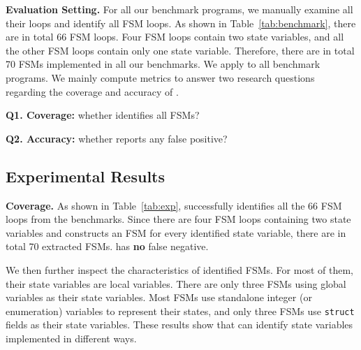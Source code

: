 \noindent\textbf{Evaluation Setting.}
For all our benchmark programs, we manually examine all their loops and
identify all FSM loops.
As shown in Table~\ref{tab:benchmark}, there are in
total 66 FSM loops.
Four FSM loops contain two state variables,
and all the other FSM loops contain only one state variable.
Therefore, there are in total 70 FSMs implemented in all our benchmarks.
We apply \Tool{} to all benchmark programs.
We mainly compute metrics to answer two research
questions regarding the coverage and accuracy of \Tool{}.

\noindent\textbf{Q1. Coverage:} whether \Tool{} identifies all FSMs?

\noindent\textbf{Q2. Accuracy:} whether \Tool{} reports any false positive?

\subsection{Experimental Results}
\label{sec:results}



\noindent\textbf{Coverage.}
As shown in Table~\ref{tab:exp}, \Tool{} successfully identifies
all the 66 FSM loops
from the benchmarks. Since there are four FSM loops containing
two state variables and \Tool{} constructs an FSM for every identified state variable,
there are in total 70 extracted FSMs.
\Tool{} has \textbf{no} false negative.



We then further inspect the characteristics of identified FSMs.
For most of them, their state variables are local variables.
There are only three FSMs using global variables as their state variables.
Most FSMs use standalone integer (or enumeration) variables to represent their states,
and only three FSMs use \texttt{struct} fields as their state variables.
These results show that \Tool{} can identify 
state variables implemented in different ways.



